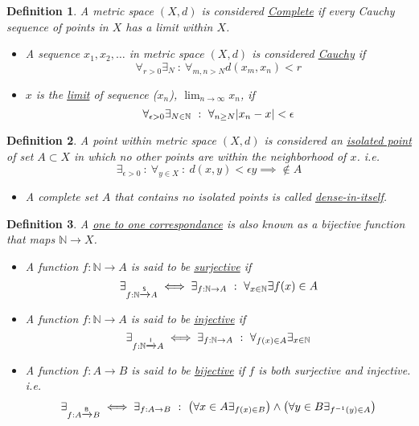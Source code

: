 \documentclass[]{article}
\newcommand{\N}{\mathbb{N}}
\newcommand{\toI}{\xrightarrow{\textsf{\tiny I}}}
\newcommand{\toS}{\xrightarrow{\textsf{\tiny S}}}
\newcommand{\toB}{\xrightarrow{\textsf{\tiny B}}}
\newcommand{\st}{\ : \ }
\newtheorem{definition}{Definition}
\begin{document}
\begin{definition}\label{def:complete_cauchy_limit}
    A metric space $(X,d)$ is considered \emph{\underline{Complete}} 
    if every Cauchy sequence of points in $X$ has a limit within $X$.
    \begin{itemize}
        \item A sequence $x_1, x_2, \dots$ in metric space $(X,d)$ 
        is considered \emph{\underline{Cauchy}} if
        \[
            \forall_{r > 0} \exists_N \st \forall_{m,n > N} d(x_m,x_n) < r
        \]
        \item $x$ is the \underline{\emph{limit}} of sequence ($x_n$), 
        $\lim_{n \to \infty} x_n$, if
        \[
            \forall_{\epsilon>0} \exists_{N \in \N} \st \forall_{n\geq N} \abs{x_n - x} < \epsilon
        \]
    \end{itemize}
\end{definition}

\begin{definition}\label{def:isolated_points}
    A point within metric space $(X,d)$ is considered an 
    \emph{\underline{isolated point}} of set $A \subset X$ 
    in which no other points are within the neighborhood of $x$.
    i.e.\[
        \exists_{\epsilon>0} \st \forall_{y \in X} 
            \st d(x,y) < \epsilon y \implies \not \in A
    \]
    \begin{itemize}
        \item A complete set $A$ that contains no isolated points is called 
            \emph{\underline{dense-in-itself}}.
    \end{itemize}
\end{definition}

\begin{definition}\label{def:sur/in/bijective_funcs}
    A \emph{\underline{one to one correspondance}} is also known as a 
    bijective function that maps $\N \to X$.
    \begin{itemize}
        \item A function $f : \N \to A$ is said to be \underline{\emph{surjective}} if\[
            \exists_{f : \N \toS A} \iff 
            \exists_{f : \N \to A} \st \forall_{x \in \N} \exists f(x) \in A
        \]

        \item A function $f : \N \to A$ is said to be \underline{\emph{injective}} if\[
            \exists_{f : \N \toI A} \iff 
            \exists_{f : \N \to A} \st \forall_{f(x) \in A} \exists_{x \in \N}
        \]

        \item A function $f : A \to B$ is said to be \underline{\emph{bijective}} 
        if $f$ is both surjective and injective.
        i.e.\[
            \exists_{f : A \toB B} \iff 
            \exists_{f : A \to B} \st 
                \qty(\forall{x \in A} \exists_{f(x) \in B}) \land
                \qty(\forall{y \in B} \exists_{f^{-1}(y) \in A})
        \]
    \end{itemize}
\end{definition}
\end{document}
